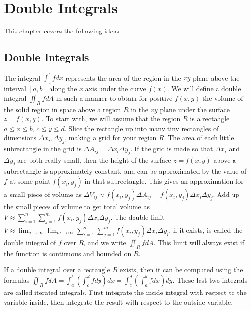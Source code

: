
\chapter{Double Integrals}

This chapter covers the following ideas. 


\section{Double Integrals}

The integral $\int_a^b fdx$ represents the area of the region in the $xy$
plane above the interval $[a,b]$ along the $x$ axis under the curve
$f(x)$.  We will define a double integral $\iint_RfdA$ in such a
manner to obtain for positive $f(x,y)$ the volume of the solid region
in space above a region $R$ in the $xy$ plane under the surface
$z=f(x,y)$. To start with, we will assume that the region $R$ is a
rectangle $a\leq x\leq b$, $c\leq y\leq d$. Slice the rectangle up into many tiny
rectangles of dimensions $\Delta x_i,\Delta y_j$, making a grid for your region
$R$.  The area of each little subrectangle in the grid is $\Delta A_{ij} =
\Delta x_i\Delta y_j$.  If the grid is made so that $\Delta x_i$ and $\Delta y_j$ are both
really small, then the height of the surface $z=f(x,y)$ above a subrectangle is approximately constant, and can be approximated by the
value of $f$ at some point $f(x_i,y_j)$ in that subrectangle. This
gives an approximation for a small piece of volume as $\Delta V_{ij}\approx
f(x_i,y_j)\Delta A_{ij} = f(x_i,y_j)\Delta x_i\Delta y_j$.  Add up the small pieces
of volume to get total volume as $V\approx \sum_{i=1}^n\sum_{j=1}^m f(x_i,y_j)\Delta
x_i\Delta y_j$.  The double limit $V\approx
\lim_{n\to\infty}\lim_{m\to\infty}\sum_{i=1}^n\sum_{j=1}^m f(x_i,y_j)\Delta x_i\Delta y_j$, if it
exists, is called the double integral of $f$ over $R$, and we write
$\iint_R fdA$. This limit will always exist if the function is
continuous and bounded on $R$.

If a double integral over a rectangle $R$ exists, then it can be
computed using the formulas $\iint_R fdA = \int_a^b \left(\int_c^d f
dy\right)dx = \int_c^d \left(\int_a^b f dx\right)dy$. These last two
integrals are called iterated integrals.  First integrate the inside
integral with respect to the variable inside, then integrate the
result with respect to the outside variable.  

